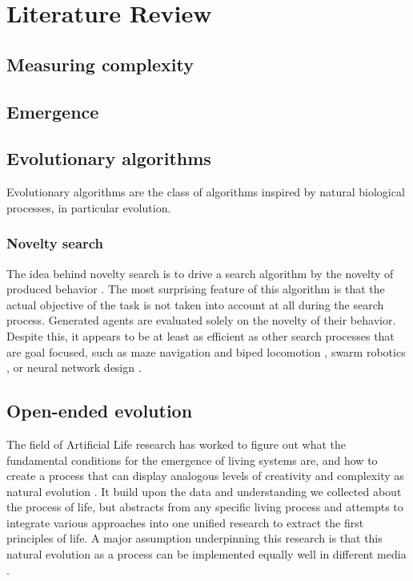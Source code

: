 \chapter{Literature Review}
\label{cha:literature-review}

\section{Measuring complexity}

\section{Emergence}

\section{Evolutionary algorithms}
Evolutionary algorithms are the class of algorithms inspired by natural
biological processes, in particular evolution.

\subsection{Novelty search}
The idea behind novelty search is to drive a search algorithm by the novelty of
produced behavior \parencite{lehmanAbandoningObjectivesEvolution2011}. The most
surprising feature of this algorithm is that the actual objective of the task is
not taken into account at all during the search process. Generated agents are
evaluated solely on the novelty of their behavior. Despite this, it appears to
be at least as efficient as other search processes that are goal focused, such
as maze navigation and biped locomotion
\parencite{lehmanAbandoningObjectivesEvolution2011}, swarm robotics
\parencite{gomesEvolutionSwarmRobotics2013}, or neural network design
\parencite{risiEvolvingPlasticNeural2010}.

\section{Open-ended evolution}
The field of Artificial Life research has worked to figure out what the
fundamental conditions for the emergence of living systems are, and how to
create a process that can display analogous levels of creativity and complexity
as natural evolution \parencite{eigenHypercycle1979,
  langtonArtificialLifeProceedings1989, dysonOriginsLife1999,
  stanleyWhyOpenEndednessMatters2019, packardOverviewOpenEndedEvolution2019,
  sorosOpenendednessLastGrand2017}. It build upon the data and understanding we
collected about the process of life, but abstracts from any specific living
process and attempts to integrate various approaches into one unified research
to extract the first principles of life. A major assumption underpinning this
research is that this natural evolution as a process can be implemented equally
well in different media \parencite{dennettDarwinDangerousIdea1996}.

